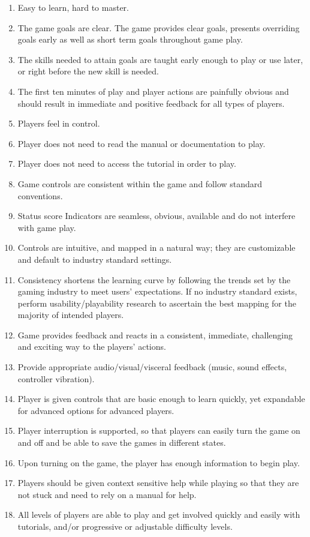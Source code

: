 \begin{enumerate}
	\item Easy to learn, hard to master.
	\item The game goals are clear. The game provides clear goals, presents overriding goals early as well as short term goals throughout game play.
	\item The skills needed to attain goals are taught early enough to play or use later, or right before the new skill is needed.
	\item The first ten minutes of play and player actions are painfully obvious and should result in immediate and positive feedback for all types of players.
	\item Players feel in control.
	\item Player does not need to read the manual or documentation to play.
	\item Player does not need to access the tutorial in order to play.
	\item Game controls are consistent within the game and follow standard conventions.
	\item Status score Indicators are seamless, obvious, available and do not interfere with game play.
	\item Controls are intuitive, and mapped in a natural way; they are customizable and default to industry standard settings.
	\item Consistency shortens the learning curve by following the trends set by the gaming industry to meet users’ expectations. If no industry standard exists, perform usability/playability research to ascertain the best mapping for the majority of intended players.
	\item Game provides feedback and reacts in a consistent, immediate, challenging and exciting way to the players’ actions.
	\item Provide appropriate audio/visual/visceral feedback (music, sound effects, controller vibration).
	\item Player is given controls that are basic enough to learn quickly, yet expandable for advanced options for advanced players.
	\item Player interruption is supported, so that players can easily turn the game on and off and be able to save the games in different states.
	\item Upon turning on the game, the player has enough information to begin play.
	\item Players should be given context sensitive help while playing so that they are not stuck and need to rely on a manual for help.
	\item All levels of players are able to play and get involved quickly and easily with tutorials, and/or progressive or adjustable difficulty levels.
\end{enumerate}

